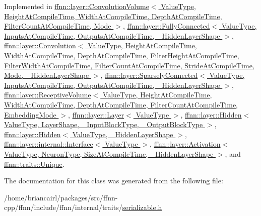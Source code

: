 Implemented in \hyperlink{classffnn_1_1layer_1_1_convolution_volume_a52d21f4ee6b841d154b1dc63bd3ed4bf}{ffnn\-::layer\-::\-Convolution\-Volume$<$ Value\-Type, Height\-At\-Compile\-Time, Width\-At\-Compile\-Time, Depth\-At\-Compile\-Time, Filter\-Count\-At\-Compile\-Time, Mode $>$}, \hyperlink{classffnn_1_1layer_1_1_fully_connected_a7c79eb99c638b61f76ea34b725c0aeef}{ffnn\-::layer\-::\-Fully\-Connected$<$ Value\-Type, Inputs\-At\-Compile\-Time, Outputs\-At\-Compile\-Time, \-\_\-\-Hidden\-Layer\-Shape $>$}, \hyperlink{classffnn_1_1layer_1_1_convolution_a48d50cf8d2c4654d0299dcac714f5095}{ffnn\-::layer\-::\-Convolution$<$ Value\-Type, Height\-At\-Compile\-Time, Width\-At\-Compile\-Time, Depth\-At\-Compile\-Time, Filter\-Height\-At\-Compile\-Time, Filter\-Width\-At\-Compile\-Time, Filter\-Count\-At\-Compile\-Time, Stride\-At\-Compile\-Time, Mode, \-\_\-\-Hidden\-Layer\-Shape $>$}, \hyperlink{classffnn_1_1layer_1_1_sparsely_connected_aa8ae358e7cf06b58f3d33be2851d0260}{ffnn\-::layer\-::\-Sparsely\-Connected$<$ Value\-Type, Inputs\-At\-Compile\-Time, Outputs\-At\-Compile\-Time, \-\_\-\-Hidden\-Layer\-Shape $>$}, \hyperlink{classffnn_1_1layer_1_1_receptive_volume_a9f813e0c5c60d572a296b8ec1fc25086}{ffnn\-::layer\-::\-Receptive\-Volume$<$ Value\-Type, Height\-At\-Compile\-Time, Width\-At\-Compile\-Time, Depth\-At\-Compile\-Time, Filter\-Count\-At\-Compile\-Time, Embedding\-Mode $>$}, \hyperlink{classffnn_1_1layer_1_1_layer_ac265fc929a178b111337226dd1cb62b6}{ffnn\-::layer\-::\-Layer$<$ Value\-Type $>$}, \hyperlink{classffnn_1_1layer_1_1_hidden_a184844a0eadeb1aa27e29b24cbb0008c}{ffnn\-::layer\-::\-Hidden$<$ Value\-Type, Layer\-Shape, \-\_\-\-Input\-Block\-Type, \-\_\-\-Output\-Block\-Type $>$}, \hyperlink{classffnn_1_1layer_1_1_hidden_a184844a0eadeb1aa27e29b24cbb0008c}{ffnn\-::layer\-::\-Hidden$<$ Value\-Type, \-\_\-\-Hidden\-Layer\-Shape $>$}, \hyperlink{classffnn_1_1layer_1_1internal_1_1_interface_a417d6fda112fdffed8091b0ebd78ed97}{ffnn\-::layer\-::internal\-::\-Interface$<$ Value\-Type $>$}, \hyperlink{classffnn_1_1layer_1_1_activation_ab5525e49c08fc593856b9c95e0eba1ee}{ffnn\-::layer\-::\-Activation$<$ Value\-Type, Neuron\-Type, Size\-At\-Compile\-Time, \-\_\-\-Hidden\-Layer\-Shape $>$}, and \hyperlink{classffnn_1_1traits_1_1_unique_ad8be6fcb9a7519603b2aab19b3c6d593}{ffnn\-::traits\-::\-Unique}.



The documentation for this class was generated from the following file\-:\begin{DoxyCompactItemize}
\item 
/home/briancairl/packages/src/ffnn-\/cpp/ffnn/include/ffnn/internal/traits/\hyperlink{serializable_8h}{serializable.\-h}\end{DoxyCompactItemize}

